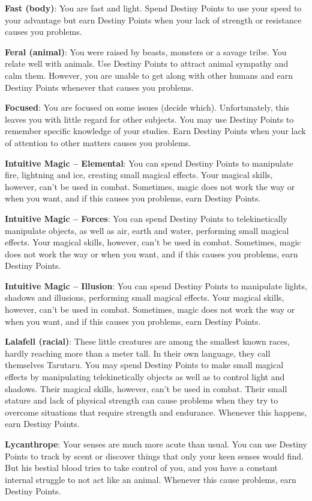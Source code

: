 \begin{multicols}{2}
\textbf{Fast (body)}: You are fast and light. Spend
Destiny Points to use your speed to your
advantage but earn Destiny Points when your lack
of strength or resistance causes you problems.

\textbf{Feral (animal)}: You were raised by beasts,
monsters or a savage tribe. You relate well with
animals. Use Destiny Points to attract animal
sympathy and calm them. However, you are unable
to get along with other humans and earn Destiny
Points whenever that causes you problems.

\textbf{Focused}: You are focused on some issues
(decide which). Unfortunately, this leaves you with
little regard for other subjects. You may use
Destiny Points to remember specific knowledge of
your studies. Earn Destiny Points when your lack
of attention to other matters causes you problems.

\textbf{Intuitive Magic – Elemental}: You can
spend Destiny Points to manipulate fire, lightning
and ice, creating small magical effects. Your
magical skills, however, can’t be used in combat.
Sometimes, magic does not work the way or when
you want, and if this causes you problems, earn
Destiny Points.

\textbf{Intuitive Magic – Forces}: You can spend
Destiny Points to telekinetically manipulate
objects, as well as air, earth and water, performing
small magical effects. Your magical skills, however,
can’t be used in combat. Sometimes, magic does
not work the way or when you want, and if this
causes you problems, earn Destiny Points.

\textbf{Intuitive Magic – Illusion}: You can spend
Destiny Points to manipulate lights, shadows and
illusions, performing small magical effects. Your
magical skills, however, can’t be used in combat.
Sometimes, magic does not work the way or when
you want, and if this causes you problems, earn
Destiny Points.

\textbf{Lalafell (racial)}: These little creatures are
among the smallest known races, hardly
reaching more than a meter tall. In their own
language, they call themselves Tarutaru.
You may spend Destiny Points to make
small magical effects by manipulating
telekinetically objects as well as to control
light and shadows. Their magical skills, however,
can’t be used in combat. 
Their small stature and lack of physical strength
can cause problems when they try to overcome
situations that require strength and endurance.
Whenever this happens, earn Destiny Points.

\textbf{Lycanthrope}: Your senses are much more
acute than usual. You can use Destiny Points to
track by scent or discover things that only your
keen senses would find. But his bestial blood tries
to take control of you, and you have a constant
internal struggle to not act like an animal.
Whenever this cause problems, earn Destiny
Points.


\end{multicols}
